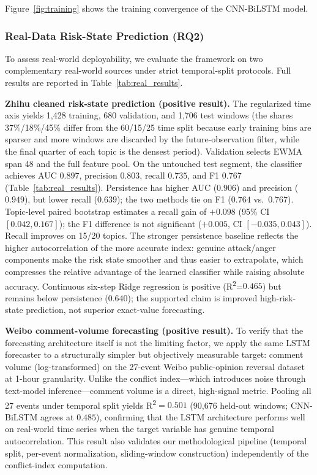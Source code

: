 \documentclass[journal]{IEEEtran}
\begin{document}
Figure~\ref{fig:training} shows the training convergence of the CNN-BiLSTM model.

\subsubsection{Real-Data Risk-State Prediction (RQ2)}

To assess real-world deployability, we evaluate the framework on two complementary real-world sources under strict temporal-split protocols. Full results are reported in Table~\ref{tab:real_results}.

\textbf{Zhihu cleaned risk-state prediction (positive result).} The regularized time axis yields 1,428 training, 680 validation, and 1,706 test windows (the shares 37\%/18\%/45\% differ from the 60/15/25 time split because early training bins are sparser and more windows are discarded by the future-observation filter, while the final quarter of each topic is the densest period). Validation selects EWMA span 48 and the full feature pool. On the untouched test segment, the classifier achieves AUC $0.897$, precision $0.803$, recall $0.735$, and F1 $0.767$ (Table~\ref{tab:real_results}). Persistence has higher AUC ($0.906$) and precision ($0.949$), but lower recall ($0.639$); the two methods tie on F1 ($0.764$ vs.\ $0.767$). Topic-level paired bootstrap estimates a recall gain of $+0.098$ (95\% CI $[0.042,0.167]$); the F1 difference is not significant ($+0.005$, CI $[-0.035,0.043]$). Recall improves on 15/20 topics. The stronger persistence baseline reflects the higher autocorrelation of the more accurate index: genuine attack/anger components make the risk state smoother and thus easier to extrapolate, which compresses the relative advantage of the learned classifier while raising absolute accuracy. Continuous six-step Ridge regression is positive (R\textsuperscript{2}=$0.465$) but remains below persistence ($0.640$); the supported claim is improved high-risk-state prediction, not superior exact-value forecasting.

\textbf{Weibo comment-volume forecasting (positive result).} To verify that the forecasting architecture itself is not the limiting factor, we apply the same LSTM forecaster to a structurally simpler but objectively measurable target: comment volume (log-transformed) on the 27-event Weibo public-opinion reversal dataset~\cite{Zhang2023Reversal} at 1-hour granularity. Unlike the conflict index---which introduces noise through text-model inference---comment volume is a direct, high-signal metric. Pooling all 27 events under temporal split yields R\textsuperscript{2}$=0.501$ (90,676 held-out windows; CNN-BiLSTM agrees at $0.485$), confirming that the LSTM architecture performs well on real-world time series when the target variable has genuine temporal autocorrelation. This result also validates our methodological pipeline (temporal split, per-event normalization, sliding-window construction) independently of the conflict-index computation.
\end{document}
